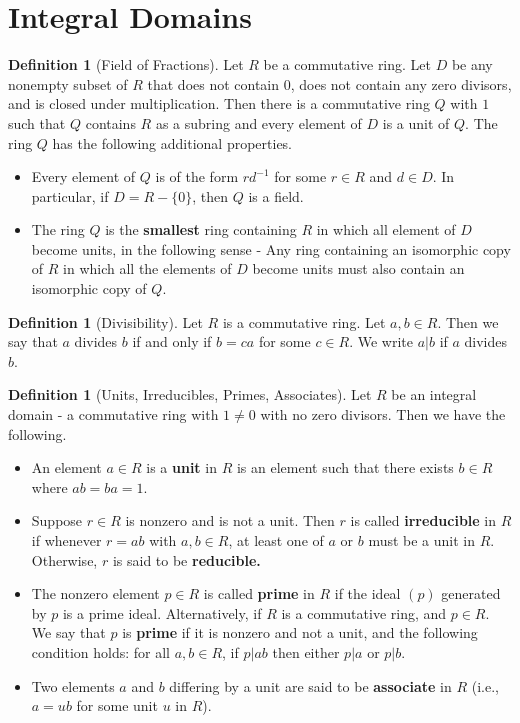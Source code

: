 \documentclass[10pt, oneside, reqno]{amsart}
\theoremstyle{plain}%
\theoremstyle{definition}
\newtheorem{defn}[thm]{Definition}
\theoremstyle{remark}
\begin{document}

\section{Integral Domains} %
\label{cha:integral_domains}


\begin{defn}[Field of Fractions]
    Let $R$ be a commutative ring.  Let $D$ be any nonempty subset of $R$ that does not contain 0, does not contain any zero divisors, and is closed under multiplication.  Then there is a commutative ring $Q$ with $1$ such that $Q$ contains $R$ as a subring and every element of $D$ is a unit of $Q$.  The ring $Q$ has the following additional properties.
    \begin{itemize}
        \item Every element of $Q$ is of the form $r d^{-1}$ for some $r \in R$ and $d \in D$.   In particular, if $D = R - \{0\}$, then $Q$ is a field.
        \item The ring $Q$ is the \textbf{smallest} ring containing $R$ in which all element of $D$ become units,
 in the following sense - Any ring containing an isomorphic copy of $R$ in which all the elements of $D$ become units must also contain an isomorphic copy of $Q$.  
    \end{itemize}
\end{defn}

\begin{defn}[Divisibility]
    Let $R$ is a commutative ring.  Let $a,b \in R$.  Then we say that $a$ divides $b$ if and only if $b = ca$ for some $c \in R$.  We write $a | b$ if $a$ divides $b$. 
\end{defn}

\begin{defn}[Units, Irreducibles, Primes, Associates]
    Let $R$ be an integral domain - a commutative ring with $1 \neq 0$ with no zero divisors.  Then we have the following.
    \begin{itemize}
        \item An element $a \in R$ is a  \textbf{unit} in $R$ is an element such that there exists $b \in R$ where $ab = ba = 1$.
        \item Suppose $r \in R$ is nonzero and is not a unit.  Then $r$ is called \textbf{irreducible } in $R$ if whenever $r = ab$ with $a,b \in R$, at least one of $a$ or $b$ must be a unit in $R$.  Otherwise, $r$ is said to be \textbf{reducible.}
        \item The nonzero element $p \in R$ is called \textbf{prime} in $R$ if the ideal $(p)$ generated by $p$ is a prime ideal.  Alternatively, if $R$ is a commutative ring, and $p \in R$.  We say that $p$ is \textbf{prime} if it is nonzero and not a unit, and the following condition holds: for all $a,b \in R$, if $p | ab$ then either $p | a$ or $p | b$.
        \item Two elements $a$ and $b$ differing by a unit are said to be \textbf{associate} in $R$ (i.e., $a = ub$ for some unit $u$ in $R$).
    \end{itemize}
\end{defn}
\end{document}
